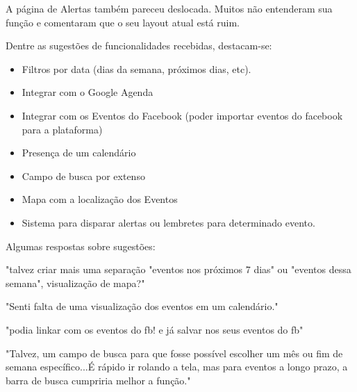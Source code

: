 \par A página de Alertas também pareceu deslocada. Muitos não entenderam sua função e comentaram que o seu layout atual está ruim.
\par Dentre as sugestões de funcionalidades recebidas, destacam-se:
\begin{itemize}
\item Filtros por data (dias da semana, próximos dias, etc).
\item Integrar com o Google Agenda
\item Integrar com os Eventos do Facebook (poder importar eventos do facebook para a plataforma)
\item Presença de um calendário
\item Campo de busca por extenso
\item Mapa com a localização dos Eventos
\item Sistema para disparar alertas ou lembretes para determinado evento.
\end{itemize}

\par Algumas respostas sobre sugestões:
\par "talvez criar mais uma separação "eventos nos próximos 7 dias" ou "eventos dessa semana", visualização de mapa?"
\par "Senti falta de uma visualização dos eventos em um calendário."
\par "podia linkar com os eventos do fb! e já salvar nos seus eventos do fb"
\par "Talvez, um campo de busca para que fosse possível escolher um mês ou fim de semana específico...É rápido ir rolando a tela, mas para eventos a longo prazo, a barra de busca cumpriria melhor a função."
